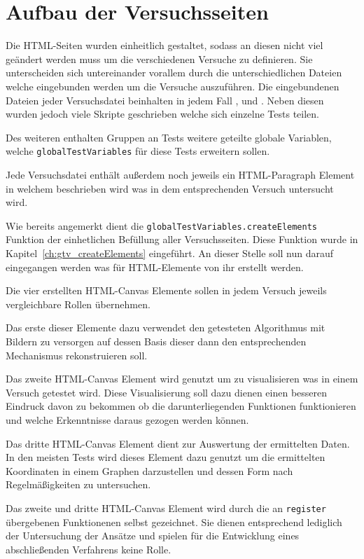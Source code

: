 \section{Aufbau der Versuchsseiten}\label{ch:aufbau_der_testseiten}

Die HTML-Seiten wurden einheitlich gestaltet, sodass an diesen nicht viel geändert werden muss um die verschiedenen Versuche zu definieren.
Sie unterscheiden sich untereinander vorallem durch die unterschiedlichen Dateien welche eingebunden werden um die Versuche auszuführen.
Die eingebundenen Dateien jeder Versuchsdatei beinhalten in jedem Fall ,  und .
Neben diesen wurden jedoch viele Skripte geschrieben welche sich einzelne Tests teilen.

Des weiteren enthalten Gruppen an Tests weitere geteilte globale Variablen, welche \lstinline{globalTestVariables} für diese Tests erweitern sollen.

Jede Versuchsdatei enthält außerdem noch jeweils ein HTML-Paragraph Element %
in welchem beschrieben wird was in dem entsprechenden Versuch untersucht wird.

Wie bereits angemerkt dient die \lstinline{globalTestVariables.createElements} Funktion der einhetlichen Befüllung aller Versuchsseiten.
Diese Funktion wurde in Kapitel~\ref{ch:gtv_createElements} eingeführt.
An dieser Stelle soll nun darauf eingegangen werden was für HTML-Elemente von ihr erstellt werden.

Die vier erstellten HTML-Canvas Elemente sollen in jedem Versuch jeweils vergleichbare Rollen übernehmen.

Das erste dieser Elemente dazu verwendet den getesteten Algorithmus mit Bildern zu versorgen auf dessen Basis dieser dann den entsprechenden Mechanismus rekonstruieren soll.

Das zweite HTML-Canvas Element wird genutzt um zu visualisieren was in einem Versuch getestet wird.
Diese Visualisierung soll dazu dienen einen besseren Eindruck davon zu bekommen ob die darunterliegenden Funktionen funktionieren und welche Erkenntnisse daraus gezogen werden können.

Das dritte HTML-Canvas Element dient zur Auswertung der ermittelten Daten.
In den meisten Tests wird dieses Element dazu genutzt um die ermittelten Koordinaten in einem Graphen darzustellen und dessen Form nach Regelmäßigkeiten zu untersuchen.

Das zweite und dritte HTML-Canvas Element wird durch die an \lstinline{register} übergebenen Funktionenen selbst gezeichnet.
Sie dienen entsprechend lediglich der Untersuchung der Ansätze und spielen für die Entwicklung eines abschließenden Verfahrens keine Rolle.

